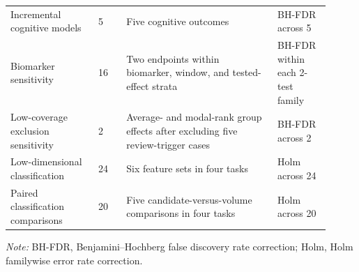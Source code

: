 \documentclass{article}
\providecommand{\DIFaddtex}[1]{{\protect\color{blue}#1}} %
\providecommand{\DIFadd}[1]{\texorpdfstring{\DIFaddtex{#1}}{#1}} %
\begin{document}
\begin{landscape}
\begin{longtable}{p{0.25\linewidth}p{0.08\linewidth}p{0.43\linewidth}p{0.15\linewidth}}
\DIFadd{Incremental cognitive models }& \DIFadd{5 }& \DIFadd{Five cognitive outcomes }& \DIFadd{BH-FDR across 5}\\
\DIFadd{Biomarker sensitivity }& \DIFadd{16 }& \DIFadd{Two endpoints within biomarker, window, and tested-effect strata }& \DIFadd{BH-FDR within each 2-test family}\\
\DIFadd{Low-coverage exclusion sensitivity }& \DIFadd{2 }& \DIFadd{Average- and modal-rank group effects after excluding five review-trigger cases }& \DIFadd{BH-FDR across 2}\\
\DIFadd{Low-dimensional classification }& \DIFadd{24 }& \DIFadd{Six feature sets in four tasks }& \DIFadd{Holm across 24}\\
\DIFadd{Paired classification comparisons }& \DIFadd{20 }& \DIFadd{Five candidate-versus-volume comparisons in four tasks }& \DIFadd{Holm across 20}\\
\bottomrule
\end{longtable}
\footnotesize\noindent\DIFadd{\textit{Note:} BH-FDR, Benjamini--Hochberg false discovery rate correction; Holm, Holm familywise error rate correction.}
\end{landscape}
\end{document}
